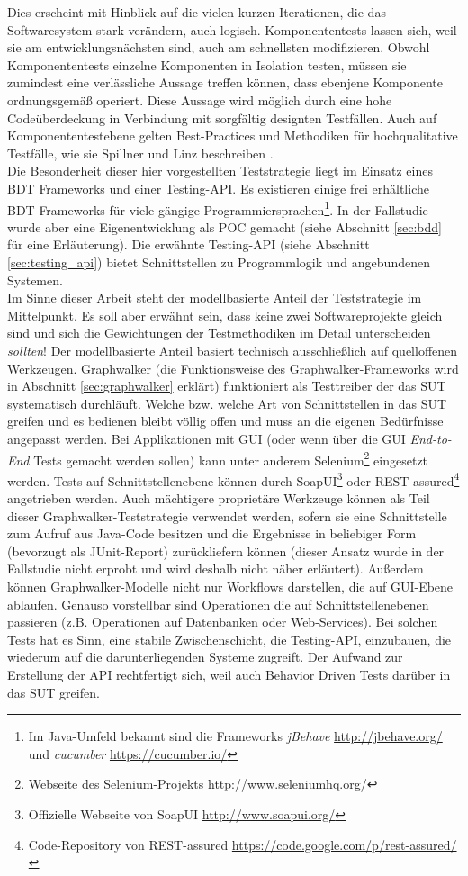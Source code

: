 Dies erscheint mit Hinblick auf die vielen kurzen Iterationen, die das Softwaresystem stark verändern, auch logisch. Komponententests lassen sich, weil sie am entwicklungsnächsten sind, auch am schnellsten modifizieren. Obwohl Komponententests einzelne Komponenten in Isolation testen, müssen sie zumindest eine verlässliche Aussage treffen können, dass ebenjene Komponente ordnungsgemäß operiert. Diese Aussage wird möglich durch eine hohe Codeüberdeckung in Verbindung mit sorgfältig designten Testfällen. Auch auf Komponententestebene gelten Best-Practices und Methodiken für hochqualitative Testfälle, wie sie Spillner und Linz beschreiben \cite{spillner_software_2014}.\\
Die Besonderheit dieser hier vorgestellten Teststrategie liegt im Einsatz eines \Gls{BDT} \cite{chelimsky_rspec_2010} Frameworks und einer Testing-API. Es existieren einige frei erhältliche \Gls{BDT} Frameworks für viele gängige Programmiersprachen\footnote{Im Java-Umfeld bekannt sind die Frameworks \textit{jBehave} \url{http://jbehave.org/} und \textit{cucumber} \url{https://cucumber.io/}}. In der Fallstudie wurde aber eine Eigenentwicklung als \Gls{POC} gemacht (siehe Abschnitt \ref{sec:bdd} für eine Erläuterung). Die erwähnte Testing-API (siehe Abschnitt \ref{sec:testing_api}) bietet Schnittstellen zu Programmlogik und angebundenen Systemen.\\
Im Sinne dieser Arbeit steht der modellbasierte Anteil der Teststrategie im Mittelpunkt. Es soll aber erwähnt sein, dass keine zwei Softwareprojekte gleich sind und sich die Gewichtungen der Testmethodiken im Detail unterscheiden \textit{sollten}! Der modellbasierte Anteil basiert technisch ausschließlich auf quelloffenen Werkzeugen. Graphwalker (die Funktionsweise des Graphwalker-Frameworks wird in Abschnitt \ref{sec:graphwalker} erklärt) funktioniert als Testtreiber der das \Gls{SUT} systematisch durchläuft. Welche bzw. welche Art von Schnittstellen in das \Gls{SUT} greifen und es bedienen bleibt völlig offen und muss an die eigenen Bedürfnisse angepasst werden. Bei Applikationen mit GUI (oder wenn über die GUI \textit{End-to-End} Tests gemacht werden sollen) kann unter anderem Selenium\footnote{Webseite des Selenium-Projekts \url{http://www.seleniumhq.org/}} eingesetzt werden. Tests auf Schnittstellenebene können durch SoapUI\footnote{Offizielle Webseite von SoapUI \url{http://www.soapui.org/}} oder REST-assured\footnote{Code-Repository von REST-assured \url{https://code.google.com/p/rest-assured/}} angetrieben werden. Auch mächtigere proprietäre Werkzeuge können als Teil dieser Graphwalker-Teststrategie verwendet werden, sofern sie eine Schnittstelle zum Aufruf aus Java-Code besitzen und die Ergebnisse in beliebiger Form (bevorzugt als JUnit-Report) zurückliefern können (dieser Ansatz wurde in der Fallstudie nicht erprobt und wird deshalb nicht näher erläutert). Außerdem können Graphwalker-Modelle nicht nur Workflows darstellen, die auf GUI-Ebene ablaufen. Genauso vorstellbar sind Operationen die auf Schnittstellenebenen passieren (z.B. Operationen auf Datenbanken oder Web-Services). Bei solchen Tests hat es Sinn, eine stabile Zwischenschicht, die Testing-API, einzubauen, die wiederum auf die darunterliegenden Systeme zugreift. Der Aufwand zur Erstellung der API rechtfertigt sich, weil auch Behavior Driven Tests darüber in das \Gls{SUT} greifen.
